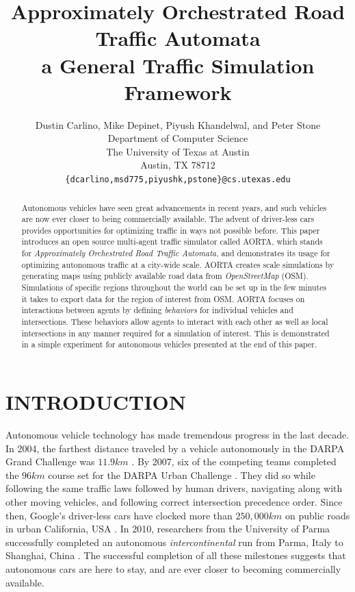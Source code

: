 \documentclass[letterpaper, 10 pt, conference]{ieeeconf}  %
\title{\LARGE \bf
Approximately Orchestrated Road Traffic Automata\\
a General Traffic Simulation Framework
}
\author{Dustin Carlino, Mike Depinet, Piyush Khandelwal, and Peter Stone\\
        Department of Computer Science\\
        The University of Texas at Austin\\
        Austin, TX 78712\\
        {\tt \small\{dcarlino,msd775,piyushk,pstone\}@cs.utexas.edu}}
\begin{document}
\maketitle
\thispagestyle{empty}
\pagestyle{empty}


\begin{abstract} 
Autonomous vehicles have seen great advancements in recent years, and
such vehicles are now ever closer to being commercially available.
The advent of driver-less cars provides opportunities for optimizing
traffic in ways not possible before. This paper introduces an open
source multi-agent traffic simulator called AORTA, which stands for
\textit{Approximately Orchestrated Road Traffic Automata}, and
demonstrates its usage for optimizing autonomous traffic at a
city-wide scale. AORTA creates scale simulations by generating maps
using publicly available road data from \textit{OpenStreetMap}
(OSM). Simulations of specific regions throughout the world can be set
up in the few minutes it takes to export data for the region of
interest from OSM. AORTA focuses on interactions between agents by
defining \textit{behaviors} for individual vehicles and
intersections. These behaviors allow agents to interact with each
other as well as local intersections in any manner required for a
simulation of interest.  This is demonstrated in a simple experiment
for autonomous vehicles presented at the end of this paper.
\end{abstract}


\section{INTRODUCTION}
\label{sec:introduction}


Autonomous vehicle technology has made tremendous progress in the last decade.
In 2004, the farthest distance traveled by a vehicle autonomously in the DARPA
Grand Challenge was $11.9km$ \cite{cnnGrandChallenge2004}. By 2007, six of the
competing teams completed the $96km$ course set for the DARPA Urban Challenge
\cite{spectrumUrbanChallenge2007}. They did so while following the same traffic
laws followed by human drivers, navigating along with other moving vehicles,
and following correct intersection precedence order. Since then, Google's
driver-less cars have clocked more than $250,000km$ on public roads in urban
California, USA \cite{tedThrun2011}. In 2010, researchers from the University
of Parma successfully completed an autonomous \textit{intercontinental} run
from Parma, Italy to Shanghai, China \cite{cnnVislab2010}. The successful
completion of all these milestones suggests that autonomous cars are here to
stay, and are ever closer to becoming commercially available. 
\end{document}
